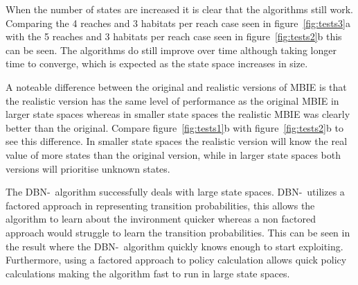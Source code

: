 When the number of states are increased it is clear that the algorithms still
work. Comparing the 4 reaches and 3 habitats per reach case seen in
figure~\ref{fig:tests3}a with the 5 reaches and 3 habitats per reach case seen
in figure~\ref{fig:tests2}b this can be seen. The algorithms do still improve
over time although taking longer time to converge, which is expected as the
state space increases in size. 

A noteable difference between the original and realistic versions of MBIE is
that the realistic version has the same level of performance as the original
MBIE in larger state spaces whereas in smaller state spaces the realistic MBIE
was clearly better than the original. Compare figure~\ref{fig:tests1}b with
figure~\ref{fig:tests2}b to see this difference. In smaller state spaces the
realistic version will know the real value of more states than the original
version, while in larger state spaces both versions will prioritise unknown
states.

The DBN-\etre\ algorithm successfully deals with large state spaces. DBN-\etre\
utilizes a factored approach in representing transition probabilities, this
allows the algorithm to learn about the invironment quicker whereas a non
factored approach would struggle to learn the transition probabilities. This
can be seen in the result where the DBN-\etre\ algorithm quickly knows enough
to start exploiting. Furthermore, using a factored approach to policy
calculation allows quick policy calculations making the algorithm fast to run
in large state spaces.
